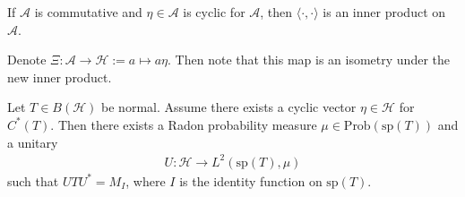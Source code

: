 If $\mathcal{A}$ is commutative and $\eta \in \mathcal{A}$ is cyclic
for $\mathcal{A}$, then $\langle \cdot , \cdot \rangle $ is an inner
product on $\mathcal{A}$.

Denote $\Xi :  \mathcal{A} \to  \mathcal{H}:= a \mapsto a \eta$. Then
note that this map is an isometry under the new inner product.

\begin{theorem}
  Let $T \in B(\mathcal{H})$ be normal. Assume there exists a cyclic
  vector $\eta \in \mathcal{H}$ for $C^*(T)$. Then there exists a
  Radon probability measure $\mu \in \textrm{Prob}(\textrm{sp}(T))$
  and a unitary
  \begin{align*}
    U: \mathcal{H} \to L^{2}(\textrm{sp}(T), \mu)
  \end{align*}
  such that $UTU^* = M_I$, where $I$ is the identity function on
  $\textrm{sp}(T)$.
\end{theorem}
